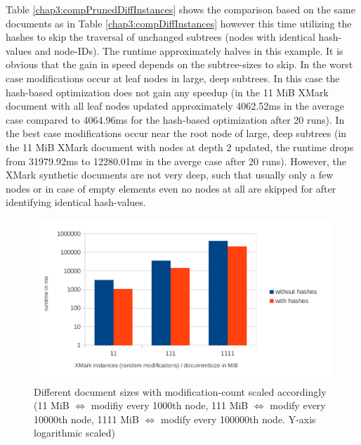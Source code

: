 Table \ref{chap3:compPrunedDiffInstances} shows the comparison based on the same documents as in Table \ref{chap3:compDiffInstances} however this time utilizing the hashes to skip the traversal of unchanged subtrees (nodes with identical hash-values and node-IDs). The runtime approximately halves in this example. It is obvious that the gain in speed depends on the subtree-sizes to skip. In the worst case modifications occur at leaf nodes in large, deep subtrees. In this case the hash-based optimization does not gain any speedup (in the 11 MiB XMark document with all leaf nodes updated approximately 4062.52ms in the average case compared to 4064.96ms for the hash-based optimization after 20 runs). In the best case modifications occur near the root node of large, deep subtrees (in the 11 MiB XMark document with nodes at depth 2 updated, the runtime drops from 31979.92ms to 12280.01ms in the averge case after 20 runs). However, the XMark synthetic documents are not very deep, such that usually only a few nodes or in case of empty elements even no nodes at all are skipped for after identifying identical hash-values.

\begin{figure}[tb]
\centering
\includegraphics[width=\textwidth]{figures/diff-docsize-scale-pruned}
\caption{Different document sizes with modification-count scaled accordingly (11 MiB $\Leftrightarrow$ modifiy every 1000th node, 111 MiB $\Leftrightarrow$ modify every 10000th node, 1111 MiB $\Leftrightarrow$ modify every 100000th node. Y-axis logarithmic scaled)} 
\label{fig:docScaling}
\end{figure}

